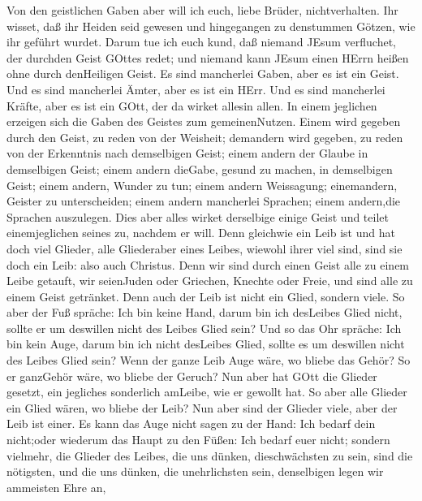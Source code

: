  Von den geistlichen Gaben aber will ich euch, liebe Brüder,
nichtverhalten.  Ihr wisset, daß ihr Heiden seid gewesen und
hingegangen zu denstummen Götzen, wie ihr geführt wurdet. 
Darum tue ich euch kund, daß niemand JEsum verfluchet, der durchden
Geist GOttes redet; und niemand kann JEsum einen HErrn heißen ohne durch
denHeiligen Geist.  Es sind mancherlei Gaben, aber es ist
ein Geist.  Und es sind mancherlei Ämter, aber es ist ein
HErr.  Und es sind mancherlei Kräfte, aber es ist ein GOtt,
der da wirket allesin allen.  In einem jeglichen erzeigen
sich die Gaben des Geistes zum gemeinenNutzen.  Einem wird
gegeben durch den Geist, zu reden von der Weisheit; demandern wird
gegeben, zu reden von der Erkenntnis nach demselbigen Geist;
 einem andern der Glaube in demselbigen Geist; einem andern
dieGabe, gesund zu machen, in demselbigen Geist;  einem
andern, Wunder zu tun; einem andern Weissagung; einemandern, Geister zu
unterscheiden; einem andern mancherlei Sprachen; einem andern,die
Sprachen auszulegen.  Dies aber alles wirket derselbige
einige Geist und teilet einemjeglichen seines zu, nachdem er will.
 Denn gleichwie ein Leib ist und hat doch viel Glieder,
alle Gliederaber eines Leibes, wiewohl ihrer viel sind, sind sie doch
ein Leib: also auch Christus.  Denn wir sind durch einen
Geist alle zu einem Leibe getauft, wir seienJuden oder Griechen, Knechte
oder Freie, und sind alle zu einem Geist getränket.  Denn
auch der Leib ist nicht ein Glied, sondern viele.  So aber
der Fuß spräche: Ich bin keine Hand, darum bin ich desLeibes Glied
nicht, sollte er um deswillen nicht des Leibes Glied sein? 
Und so das Ohr spräche: Ich bin kein Auge, darum bin ich nicht desLeibes
Glied, sollte es um deswillen nicht des Leibes Glied sein? 
Wenn der ganze Leib Auge wäre, wo bliebe das Gehör? So er ganzGehör
wäre, wo bliebe der Geruch?  Nun aber hat GOtt die Glieder
gesetzt, ein jegliches sonderlich amLeibe, wie er gewollt hat.
 So aber alle Glieder ein Glied wären, wo bliebe der Leib?
 Nun aber sind der Glieder viele, aber der Leib ist einer.
 Es kann das Auge nicht sagen zu der Hand: Ich bedarf dein
nicht;oder wiederum das Haupt zu den Füßen: Ich bedarf euer nicht;
 sondern vielmehr, die Glieder des Leibes, die uns dünken,
dieschwächsten zu sein, sind die nötigsten,  und die uns
dünken, die unehrlichsten sein, denselbigen legen wir ammeisten Ehre an,
